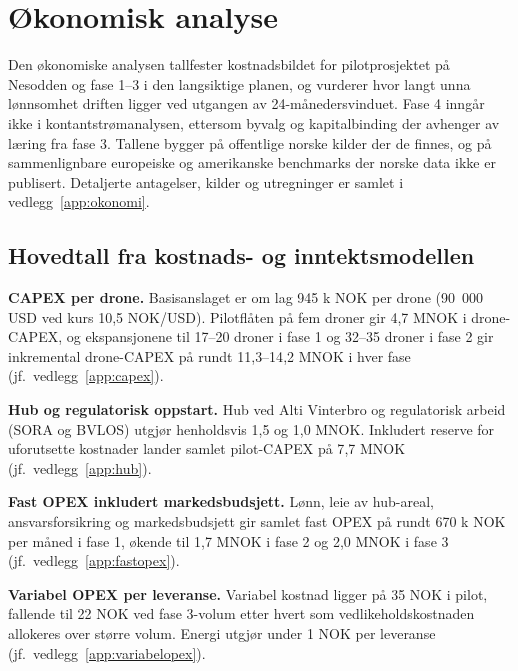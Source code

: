 \section{Økonomisk analyse}

Den økonomiske analysen tallfester kostnadsbildet for pilotprosjektet på
Nesodden og fase 1--3 i den langsiktige planen, og vurderer hvor langt
unna lønnsomhet driften ligger ved utgangen av 24-måneders\-vinduet.
Fase 4 inngår ikke i kontantstrøm\-analysen, ettersom byvalg og
kapitalbinding der avhenger av læring fra fase 3. Tallene bygger på
offentlige norske kilder der de finnes, og på sammenlignbare europeiske
og amerikanske benchmarks der norske data ikke er publisert. Detaljerte
antagelser, kilder og utregninger er samlet i vedlegg~\ref{app:okonomi}.

\subsection{Hovedtall fra kostnads- og inntektsmodellen}

\textbf{CAPEX per drone.} Basisanslaget er om lag 945 k NOK per drone
(90~000 USD ved kurs 10{,}5 NOK/USD). Pilotflåten på fem droner gir
4{,}7 MNOK i drone-CAPEX, og ekspansjonene til 17--20 droner i fase 1
og 32--35 droner i fase 2 gir inkremental drone-CAPEX på rundt
11{,}3--14{,}2 MNOK i hver fase (jf.\ vedlegg~\ref{app:capex}).

\textbf{Hub og regulatorisk oppstart.} Hub ved Alti Vinterbro og
regulatorisk arbeid (SORA og BVLOS) utgjør henholdsvis 1{,}5 og
1{,}0 MNOK. Inkludert reserve for uforutsette kostnader lander samlet
pilot-CAPEX på 7{,}7 MNOK (jf.\ vedlegg~\ref{app:hub}).

\textbf{Fast OPEX inkludert markedsbudsjett.} Lønn, leie av hub-areal,
ansvarsforsikring og markedsbudsjett gir samlet fast OPEX på rundt
670 k NOK per måned i fase 1, økende til 1{,}7 MNOK i fase 2 og
2{,}0 MNOK i fase 3 (jf.\ vedlegg~\ref{app:fastopex}).

\textbf{Variabel OPEX per leveranse.} Variabel kostnad ligger på
35 NOK i pilot, fallende til 22 NOK ved fase 3-volum etter hvert som
vedlikeholdskostnaden allokeres over større volum. Energi utgjør under
1 NOK per leveranse (jf.\ vedlegg~\ref{app:variabelopex}).

